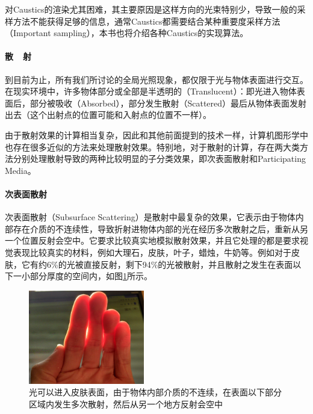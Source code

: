 对Caustics的渲染尤其困难，其主要原因是这样方向的光束特别少，导致一般的采样方法不能获得足够的信息，通常Caustics都需要结合某种重要度采样方法（Important sampling），本书也将介绍各种Caustics的实现算法。






\paragraph{散~~射}
到目前为止，所有我们所讨论的全局光照现象，都仅限于光与物体表面进行交互。在现实环境中，许多物体部分或全部是半透明的（Translucent）：即光进入物体表面后，部分被吸收（Absorbed），部分发生散射（Scattered）最后从物体表面发射出去（这个出射点的位置可能和入射点的位置不一样）。

由于散射效果的计算相当复杂，因此和其他前面提到的技术一样，计算机图形学中也存在很多近似的方法来处理散射效果。特别地，对于散射的计算，存在两大类方法分别处理散射导致的两种比较明显的子分类效果，即次表面散射和Participating Media。


\paragraph{次表面散射}
次表面散射（Subsurface Scattering）是散射中最复杂的效果，它表示由于物体内部存在介质的不连续性，导致折射进物体内部的光在经历多次散射之后，重新从另一个位置反射会空中。它要求比较真实地模拟散射效果，并且它处理的都是要求视觉表现比较真实的材料，例如大理石，皮肤，叶子，蜡烛，牛奶等。例如对于皮肤，它有约6\%的光被直接反射，剩下94\%的光被散射，并且散射之发生在表面以下一小部分厚度的空间内，如图\ref{f:intro-sss}所示。

\begin{figure}
\sidecaption
\includegraphics[width=0.45\textwidth]{figures/intro/subsurface-scattering}	
\caption{光可以进入皮肤表面，由于物体内部介质的不连续，在表面以下部分区域内发生多次散射，然后从另一个地方反射会空中}
\label{f:intro-sss}
\end{figure}

